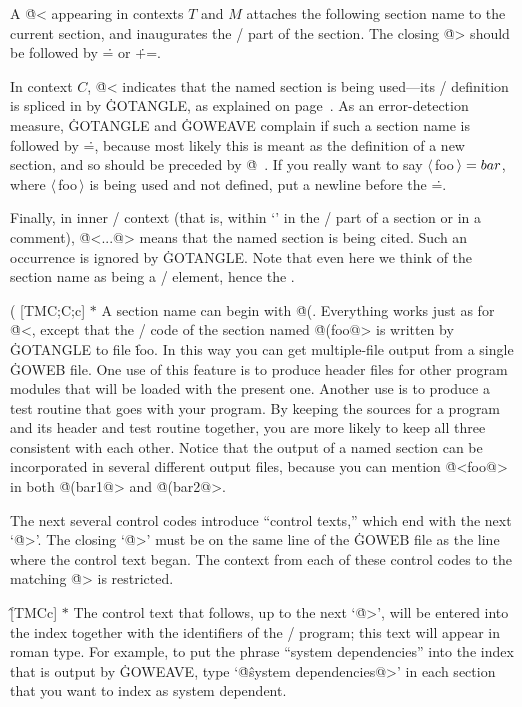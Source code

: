 \more A \.{@<} appearing in contexts $T$ and $M$ attaches the
following section name to the current section, and inaugurates the
\GO/ part of the section.  The closing \.{@>} should be followed by
\.{=} or \.{+=}.

\more
In context $C$, \.{@<} indicates that the named
section is being used---its \GO/ definition is spliced in by
\.{GOTANGLE}, as explained on page~\tangref.
As an error-detection measure,
\.{GOTANGLE} and \.{GOWEAVE} complain if such a section name is followed
by \.=, because most likely this is meant as the definition of a new
section, and so should be preceded by \.{@\ }.  If you really want to
say $\langle\,$foo$\,\rangle=\\{bar}$, where $\langle\,$foo$\,\rangle$
is being used and not defined, put a newline before the \.=.

\more
Finally, in inner \GO/ context (that is, within `\pb' in the \TEX/ part
of a section or in a comment), \.{@<...@>}
means that the named section is being
cited.  Such an occurrence is ignored by \.{GOTANGLE}. Note that
even here we think of the section name as being a \GO/ element, hence the \pb.

\@( [TM\to C;\;C;\;c] $*$ A section name can begin with \.{@(}.
Everything works just as for \.{@<}, except that the \GO/ code
of the section named \.{@(foo@>} is written by \.{GOTANGLE}
to file \.{foo}. In this way you can get multiple-file output from
a single \.{GOWEB} file. One use of this feature
is to produce header files for other program modules that will be loaded
with the present one. Another use is to produce a test routine that
goes with your program. By keeping the sources for a program and its
header and test routine together, you are more likely to keep
all three consistent with each other. Notice that the output of a named
section can be incorporated in several different output files, because
you can mention \.{@<foo@>} in both \.{@(bar1@>} and \.{@(bar2@>}.

\subsec
The next several control codes introduce ``control
texts,'' which end with the next `\.{@>}'.  The closing `\.{@>}' must be on
the same line of the \.{GOWEB} file as the line where the control text began.
The context from each of these control codes to the matching \.{@>} is
restricted.

\@\^ [TMCc] $*$ The control text that follows, up to the next
`\.{@>}', will be entered into the index together with the identifiers of
the \GO/ program; this text will appear in roman type. For example, to
put the phrase ``system dependencies'' into the index that is output by
\.{GOWEAVE}, type
`\.{@\^system dependencies@>}' in each section
that you want to index as system dependent.

